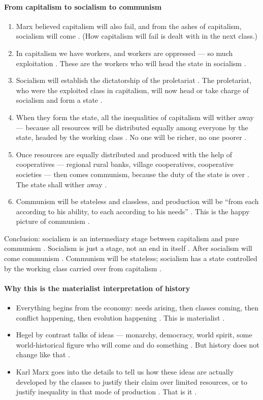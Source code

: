 \paragraph{From capitalism to socialism to communism}
\begin{enumerate}
    \item Marx believed capitalism will also fail, and from the ashes of capitalism, socialism will come . (How capitalism will fail is dealt with in the next class.) 
    \item In capitalism we have workers, and workers are oppressed --- so much exploitation . These are the workers who will head the state in socialism .
    \item Socialism will establish the dictatorship of the proletariat . The proletariat, who were the exploited class in capitalism, will now head or take charge of socialism and form a state .
    \item When they form the state, all the inequalities of capitalism will wither away --- because all resources will be distributed equally among everyone by the state, headed by the working class . No one will be richer, no one poorer .
    \item Once resources are equally distributed and produced with the help of cooperatives --- regional rural banks, village cooperatives, cooperative societies --- then comes communism, because the duty of the state is over . The state shall wither away .
    \item Communism will be stateless and classless, and production will be ``from each according to his ability, to each according to his needs'' . This is the happy picture of communism .
\end{enumerate}

\begin{KeyConcept}
Conclusion: socialism is an intermediary stage between capitalism and pure communism . Socialism is just a stage, not an end in itself . After socialism will come communism . Communism will be stateless; socialism has a state controlled by the working class carried over from capitalism .
\end{KeyConcept}

\paragraph{Why this is the materialist interpretation of history}
\begin{itemize}
    \item Everything begins from the economy: needs arising, then classes coming, then conflict happening, then evolution happening . This is materialist .
    \item Hegel by contrast talks of ideas --- monarchy, democracy, world spirit, some world-historical figure who will come and do something . But history does not change like that .
    \item Karl Marx goes into the details to tell us how these ideas are actually developed by the classes to justify their claim over limited resources, or to justify inequality in that mode of production . That is it .
\end{itemize}

